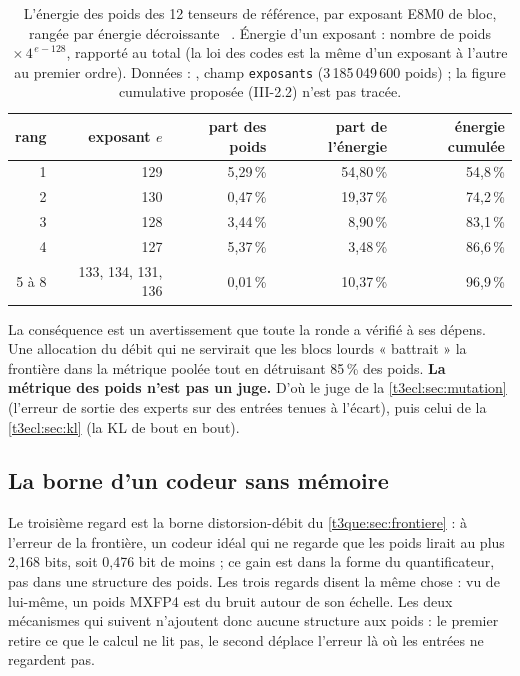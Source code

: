 \begin{table}[tbp]
\centering\small
\begin{tabular}{r r r r r}
\toprule
rang & exposant $e$ & part des poids & part de l'énergie & énergie cumulée \\
\midrule
1 & 129 & 5,29\,\% & 54,80\,\% & 54,8\,\% \\
2 & 130 & 0,47\,\% & 19,37\,\% & 74,2\,\% \\
3 & 128 & 3,44\,\% & 8,90\,\% & 83,1\,\% \\
4 & 127 & 5,37\,\% & 3,48\,\% & 86,6\,\% \\
5 à 8 & 133, 134, 131, 136 & 0,01\,\% & 10,37\,\% & 96,9\,\% \\
\bottomrule
\end{tabular}
\caption[L'énergie des poids par exposant de bloc]{L'énergie des poids des 12 tenseurs de référence, par exposant E8M0 de bloc, rangée par énergie décroissante \mes~\calc. Énergie d'un exposant : nombre de poids $\times\, 4^{\,e-128}$, rapporté au total (la loi des codes est la même d'un exposant à l'autre au premier ordre). Données : , champ \texttt{exposants} (3\,185\,049\,600 poids) ; la figure cumulative proposée (III-2.2) n'est pas tracée.}
\label{t3ecl:tab:exposants}
\end{table}

La conséquence est un avertissement que toute la ronde a vérifié à ses dépens. Une allocation du débit qui ne servirait que les blocs lourds « battrait » la frontière dans la métrique poolée tout en détruisant 85\,\% des poids. \textbf{La métrique des poids n'est pas un juge.} D'où le juge de la \cref{t3ecl:sec:mutation} (l'erreur de sortie des experts sur des entrées tenues à l'écart), puis celui de la \cref{t3ecl:sec:kl} (la KL de bout en bout).

\subsection{La borne d'un codeur sans mémoire}

Le troisième regard est la borne distorsion-débit du \cref{t3que:sec:frontiere} : à l'erreur de la frontière, un codeur idéal qui ne regarde que les poids lirait au plus 2,168 bits, soit 0,476 bit de moins ; ce gain est dans la forme du quantificateur, pas dans une structure des poids. Les trois regards disent la même chose : vu de lui-même, un poids MXFP4 est du bruit autour de son échelle. Les deux mécanismes qui suivent n'ajoutent donc aucune structure aux poids : le premier retire ce que le calcul ne lit pas, le second déplace l'erreur là où les entrées ne regardent pas.

